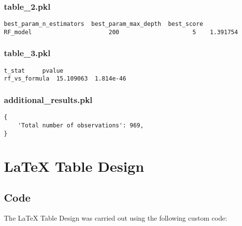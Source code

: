 \documentclass[11pt]{article}
\begin{document}
\subsubsection*{table\_2.pkl}

\begin{Verbatim}[tabsize=4]
          best_param_n_estimators  best_param_max_depth  best_score
RF_model                      200                     5    1.391754
\end{Verbatim}

\subsubsection*{table\_3.pkl}

\begin{Verbatim}[tabsize=4]
                  t_stat     pvalue
rf_vs_formula  15.109063  1.814e-46
\end{Verbatim}

\subsubsection*{additional\_results.pkl}

\begin{Verbatim}[tabsize=4]
{
    'Total number of observations': 969,
}
\end{Verbatim}

\section{LaTeX Table Design}
\subsection{{Code}}
The LaTeX Table Design was carried out using the following custom code:
\end{document}

